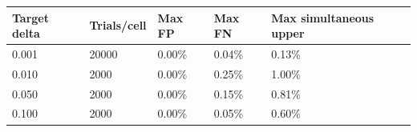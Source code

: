 \begin{tabular}{lllll}
\toprule
Target delta & Trials/cell & Max FP & Max FN & Max simultaneous upper \\
\midrule
0.001 & 20000 & 0.00\% & 0.04\% & 0.13\% \\
0.010 & 2000 & 0.00\% & 0.25\% & 1.00\% \\
0.050 & 2000 & 0.00\% & 0.15\% & 0.81\% \\
0.100 & 2000 & 0.00\% & 0.05\% & 0.60\% \\
\bottomrule
\end{tabular}
